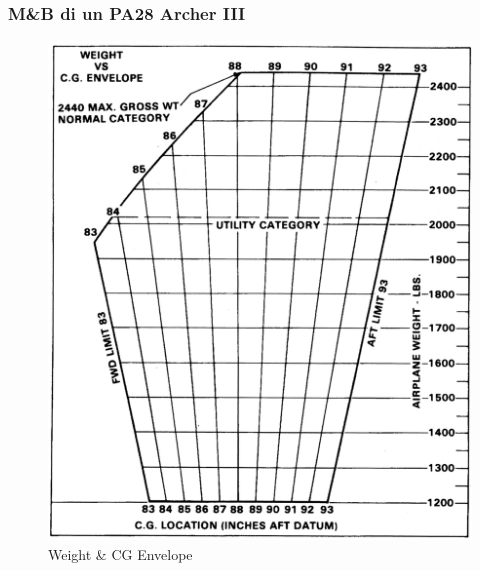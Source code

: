 \documentclass{beamer}
\begin{document}
\begin{frame}
\frametitle{M\&B di un PA28 Archer III}
\begin{figure}
\includegraphics[scale=0.27]{./images/pa28envelope}
\caption{Weight \& CG Envelope}
\end{figure}
\end{frame}
\end{document}
